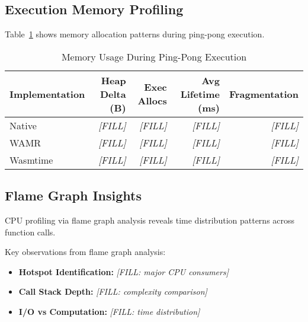 \subsection{Execution Memory Profiling}
\label{subsec:memory-execution}

Table~\ref{tab:memory-execution} shows memory allocation patterns during ping-pong execution.

\begin{table}[htbp]
\centering
\caption{Memory Usage During Ping-Pong Execution}
\label{tab:memory-execution}
\begin{tabular}{lrrrr}
\toprule
\textbf{Implementation} & \textbf{Heap Delta (B)} & \textbf{Exec Allocs} & \textbf{Avg Lifetime (ms)} & \textbf{Fragmentation} \\
\midrule
Native        & \textit{[FILL]} & \textit{[FILL]} & \textit{[FILL]} & \textit{[FILL]} \\
WAMR          & \textit{[FILL]} & \textit{[FILL]} & \textit{[FILL]} & \textit{[FILL]} \\
Wasmtime      & \textit{[FILL]} & \textit{[FILL]} & \textit{[FILL]} & \textit{[FILL]} \\
\bottomrule
\end{tabular}
\end{table}

\subsection{Flame Graph Insights}
\label{subsec:flamegraph-analysis}

CPU profiling via flame graph analysis reveals time distribution patterns across function calls.


Key observations from flame graph analysis:
\begin{itemize}
    \item \textbf{Hotspot Identification:} \textit{[FILL: major CPU consumers]}
    \item \textbf{Call Stack Depth:} \textit{[FILL: complexity comparison]}
    \item \textbf{I/O vs Computation:} \textit{[FILL: time distribution]}
\end{itemize}

